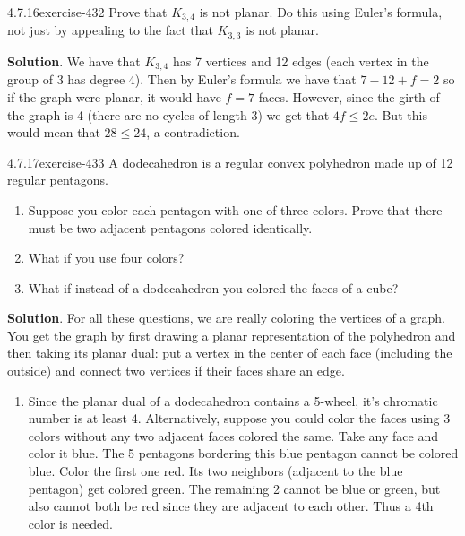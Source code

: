 \documentclass[twoside,11pt,]{book}
\numberwithin{equation}{chapter}
\begin{document}
\begin{divisionsolution}{4.7.16}{}{exercise-432}%
\hypertarget{p-4970}{}%
Prove that \(K_{3,4}\) is not planar. Do this using Euler's formula, not just by appealing to the fact that \(K_{3,3}\) is not planar.%
\par\smallskip%
\noindent\textbf{Solution}.\quad%
\hypertarget{p-4971}{}%
We have that \(K_{3,4}\) has 7 vertices and 12 edges (each vertex in the group of 3 has degree 4). Then by Euler's formula we have that \(7 - 12 + f = 2\) so if the graph were planar, it would have \(f = 7\) faces. However, since the girth of the graph is 4 (there are no cycles of length 3) we get that \(4f \le 2e\). But this would mean that \(28 \le 24\), a contradiction.%
\end{divisionsolution}%
\begin{divisionsolution}{4.7.17}{}{exercise-433}%
\hypertarget{p-4972}{}%
A dodecahedron is a regular convex polyhedron made up of 12 regular pentagons.\leavevmode%
\begin{enumerate}[label=(\alph*)]
\item\hypertarget{li-2388}{}\hypertarget{p-4973}{}%
Suppose you color each pentagon with one of three colors. Prove that there must be two adjacent pentagons colored identically.%
\item\hypertarget{li-2389}{}\hypertarget{p-4974}{}%
What if you use four colors?%
\item\hypertarget{li-2390}{}\hypertarget{p-4975}{}%
What if instead of a dodecahedron you colored the faces of a cube?%
\end{enumerate}
%
\par\smallskip%
\noindent\textbf{Solution}.\quad%
\hypertarget{p-4976}{}%
For all these questions, we are really coloring the vertices of a graph. You get the graph by first drawing a planar representation of the polyhedron and then taking its planar dual: put a vertex in the center of each face (including the outside) and connect two vertices if their faces share an edge.\leavevmode%
\begin{enumerate}[label=(\alph*)]
\item\hypertarget{li-2391}{}\hypertarget{p-4977}{}%
Since the planar dual of a dodecahedron contains a 5-wheel, it's chromatic number is at least 4. Alternatively, suppose you could color the faces using 3 colors without any two adjacent faces colored the same. Take any face and color it blue. The 5 pentagons bordering this blue pentagon cannot be colored blue. Color the first one red. Its two neighbors (adjacent to the blue pentagon) get colored green. The remaining 2 cannot be blue or green, but also cannot both be red since they are adjacent to each other. Thus a 4th color is needed.%

\end{enumerate}
\end{divisionsolution}
\end{document}
